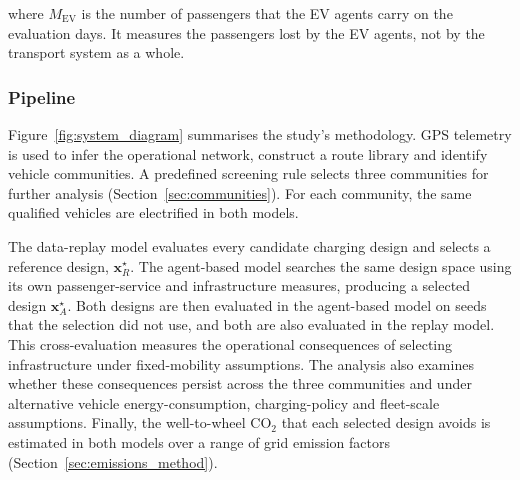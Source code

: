 \documentclass{elsarticle}
\newcommand{\xR}{\ensuremath{\mathbf{x}_R^{\star}}}
\newcommand{\xA}{\ensuremath{\mathbf{x}_A^{\star}}}
\begin{document}
\noindent where \( M_{\mathrm{EV}} \) is the number of passengers that the EV agents carry on the evaluation days. It measures the passengers lost by the EV agents, not by the transport system as a whole.

\subsubsection{Pipeline}
Figure~\ref{fig:system_diagram} summarises the study's methodology. GPS telemetry is used to infer the operational network, construct a route library and identify vehicle communities. A predefined screening rule selects three communities for further analysis (Section~\ref{sec:communities}). For each community, the same qualified vehicles are electrified in both models.

The data-replay model evaluates every candidate charging design and selects a reference design, \(\xR\). The agent-based model searches the same design space using its own passenger-service and infrastructure measures, producing a selected design \(\xA\). Both designs are then evaluated in the agent-based model on seeds that the selection did not use, and both are also evaluated in the replay model. This cross-evaluation measures the operational consequences of selecting infrastructure under fixed-mobility assumptions. The analysis also examines whether these consequences persist across the three communities and under alternative vehicle energy-consumption, charging-policy and fleet-scale assumptions. Finally, the well-to-wheel CO$_2$ that each selected design avoids is estimated in both models over a range of grid emission factors (Section~\ref{sec:emissions_method}).
\end{document}
